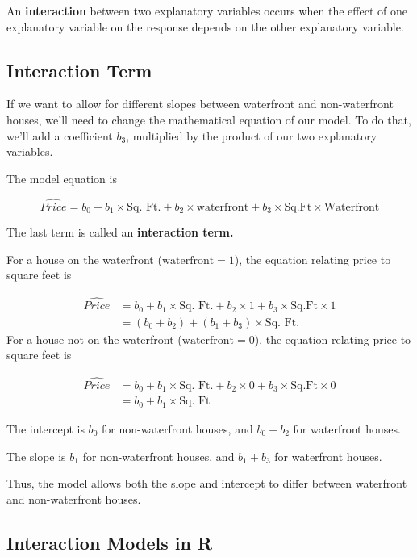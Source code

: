 \documentclass[
  letterpaper,
  DIV=11,
  numbers=noendperiod]{scrreprt}
\begin{document}
An \textbf{interaction} between two explanatory variables occurs when
the effect of one explanatory variable on the response depends on the
other explanatory variable.

\subsection{Interaction Term}\label{interaction-term}

If we want to allow for different slopes between waterfront and
non-waterfront houses, we'll need to change the mathematical equation of
our model. To do that, we'll add a coefficient \(b_3\), multiplied by
the product of our two explanatory variables.

The model equation is

\[
\widehat{Price} = b_0 + b_1\times\text{Sq. Ft.} + b_2\times\text{waterfront} + b_3\times\text{Sq.Ft}\times\text{Waterfront}
\]

The last term is called an \textbf{interaction term.}

For a house on the waterfront (\(\text{waterfront}=1\)), the equation
relating price to square feet is

\[
\begin{aligned}
\widehat{Price} & = b_0 + b_1\times\text{Sq. Ft.} + b_2\times\text{1} + b_3\times\text{Sq.Ft}\times\text{1} \\
& = (b_0+b_2) + (b_1+b_3)\times{\text{Sq. Ft.}}
\end{aligned}
\] For a house not on the waterfront (\(\text{waterfront}=0\)), the
equation relating price to square feet is

\[
\begin{aligned}
\widehat{Price} & = b_0 + b_1\times\text{Sq. Ft.} + b_2\times\text{0} + b_3\times\text{Sq.Ft}\times\text{0} \\
& = b_0 + b_1\times{\text{Sq. Ft}}
\end{aligned}
\]

The intercept is \(b_0\) for non-waterfront houses, and \(b_0 + b_2\)
for waterfront houses.

The slope is \(b_1\) for non-waterfront houses, and \(b_1 + b_3\) for
waterfront houses.

Thus, the model allows both the slope and intercept to differ between
waterfront and non-waterfront houses.

\subsection{Interaction Models in R}\label{interaction-models-in-r}
\end{document}
